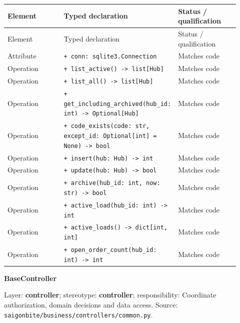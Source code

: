 \begin{longtable}{>{\raggedright\arraybackslash}p{0.3067\linewidth}>{\raggedright\arraybackslash}p{0.3067\linewidth}>{\raggedright\arraybackslash}p{0.3067\linewidth}}
Element & Typed declaration & Status / qualification \\
\hline\endfirsthead
Element & Typed declaration & Status / qualification \\
\hline\endhead
Attribute & \texttt{+ conn: sqlite3.\allowbreak{}Connection} & Matches code \\
Operation & \texttt{+ list\_\allowbreak{}active() -\textgreater{} list[Hub]} & Matches code \\
Operation & \texttt{+ list\_\allowbreak{}all() -\textgreater{} list[Hub]} & Matches code \\
Operation & \texttt{+ get\_\allowbreak{}including\_\allowbreak{}archived(hub\_\allowbreak{}id: int) -\textgreater{} Optional[Hub]} & Matches code \\
Operation & \texttt{+ code\_\allowbreak{}exists(code: str, except\_\allowbreak{}id: Optional[int] = None) -\textgreater{} bool} & Matches code \\
Operation & \texttt{+ insert(hub: Hub) -\textgreater{} int} & Matches code \\
Operation & \texttt{+ update(hub: Hub) -\textgreater{} bool} & Matches code \\
Operation & \texttt{+ archive(hub\_\allowbreak{}id: int, now: str) -\textgreater{} bool} & Matches code \\
Operation & \texttt{+ active\_\allowbreak{}load(hub\_\allowbreak{}id: int) -\textgreater{} int} & Matches code \\
Operation & \texttt{+ active\_\allowbreak{}loads() -\textgreater{} dict[int, int]} & Matches code \\
Operation & \texttt{+ open\_\allowbreak{}order\_\allowbreak{}count(hub\_\allowbreak{}id: int) -\textgreater{} int} & Matches code \\
\end{longtable}
\textbf{BaseController}

Layer: \textbf{controller}; stereotype: \textbf{\guillemotleft{}controller\guillemotright{}}; responsibility: Coordinate authorization, domain decisions and data access. Source: \texttt{saigonbite/\allowbreak{}business/\allowbreak{}controllers/\allowbreak{}common.\allowbreak{}py}.

